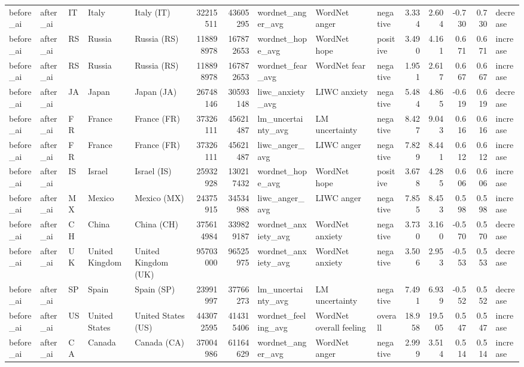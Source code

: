 \begin{tabular}{lllllrrlllrrrrl}
before\_ai & after\_ai & IT & Italy & Italy (IT) & 32215511 & 43605295 & wordnet\_anger\_avg & WordNet anger & negative & 3.334 & 2.604 & -0.730 & 0.730 & decrease \\
before\_ai & after\_ai & RS & Russia & Russia (RS) & 118898978 & 167872653 & wordnet\_hope\_avg & WordNet hope & positive & 3.490 & 4.161 & 0.671 & 0.671 & increase \\
before\_ai & after\_ai & RS & Russia & Russia (RS) & 118898978 & 167872653 & wordnet\_fear\_avg & WordNet fear & negative & 1.951 & 2.617 & 0.667 & 0.667 & increase \\
before\_ai & after\_ai & JA & Japan & Japan (JA) & 26748146 & 30593148 & liwc\_anxiety\_avg & LIWC anxiety & negative & 5.484 & 4.865 & -0.619 & 0.619 & decrease \\
before\_ai & after\_ai & FR & France & France (FR) & 37326111 & 45621487 & lm\_uncertainty\_avg & LM uncertainty & negative & 8.427 & 9.043 & 0.616 & 0.616 & increase \\
before\_ai & after\_ai & FR & France & France (FR) & 37326111 & 45621487 & liwc\_anger\_avg & LIWC anger & negative & 7.829 & 8.441 & 0.612 & 0.612 & increase \\
before\_ai & after\_ai & IS & Israel & Israel (IS) & 25932928 & 130217432 & wordnet\_hope\_avg & WordNet hope & positive & 3.678 & 4.285 & 0.606 & 0.606 & increase \\
before\_ai & after\_ai & MX & Mexico & Mexico (MX) & 24375915 & 34534988 & liwc\_anger\_avg & LIWC anger & negative & 7.855 & 8.453 & 0.598 & 0.598 & increase \\
before\_ai & after\_ai & CH & China & China (CH) & 375614984 & 339829187 & wordnet\_anxiety\_avg & WordNet anxiety & negative & 3.730 & 3.160 & -0.570 & 0.570 & decrease \\
before\_ai & after\_ai & UK & United Kingdom & United Kingdom (UK) & 95703000 & 96525975 & wordnet\_anxiety\_avg & WordNet anxiety & negative & 3.506 & 2.953 & -0.553 & 0.553 & decrease \\
before\_ai & after\_ai & SP & Spain & Spain (SP) & 23991997 & 37766273 & lm\_uncertainty\_avg & LM uncertainty & negative & 7.491 & 6.939 & -0.552 & 0.552 & decrease \\
before\_ai & after\_ai & US & United States & United States (US) & 443072595 & 414315406 & wordnet\_feeling\_avg & WordNet overall feeling & overall & 18.958 & 19.505 & 0.547 & 0.547 & increase \\
before\_ai & after\_ai & CA & Canada & Canada (CA) & 37004986 & 61164629 & wordnet\_anger\_avg & WordNet anger & negative & 2.999 & 3.514 & 0.514 & 0.514 & increase \\

\end{tabular}
